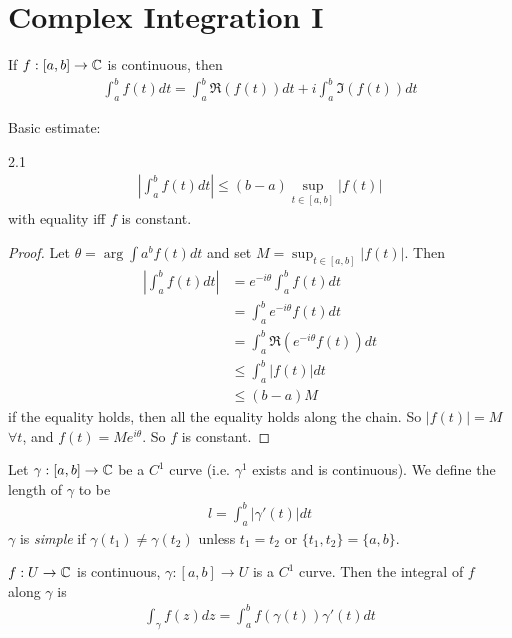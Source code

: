 \documentclass[a4paper]{article}
\begin{document}
\newpage

\section{Complex Integration I}
If $f:[a,b] \to \mathbb{C}$ is continuous, then
\begin{equation*}
\begin{aligned}
\int_a^b f(t) dt = \int_a^b \Re(f(t))dt + i \int_a^b \Im(f(t))dt
\end{aligned}
\end{equation*}

Basic estimate:
\begin{prop} 2.1\\
\begin{equation*}
\begin{aligned}
\left|\int_a^b f(t)dt\right| \leq (b-a) \sup_{t\in[a,b]} |f(t)|
\end{aligned}
\end{equation*}
with equality iff $f$ is constant.
\begin{proof}
Let $\theta = \arg\int a^b f(t) dt$ and set $M = \sup_{t \in [a,b]} |f(t)|$. Then
\begin{equation*}
\begin{aligned}
\left|\int_a^b f(t) dt\right| &= e^{-i\theta} \int_a^b f(t)dt\\
&= \int_a^b e^{-i\theta} f(t)dt\\
&= \int_a^b \Re(e^{-i\theta} f(t)) dt\\
&\leq \int_a^b |f(t)|dt\\
&\leq (b-a)M
\end{aligned}
\end{equation*}
if the equality holds, then all the equality holds along the chain. So $|f(t)|=M$ $\forall t$, and $f(t) = Me^{i\theta}$. So $f$ is constant.
\end{proof}
\end{prop}

Let $\gamma:[a,b] \to \mathbb{C}$ be a $C^1$ curve (i.e. $\gamma^1$ exists and is continuous). We define the length of $\gamma$ to be
\begin{equation*}
\begin{aligned}
l = \int_a^b |\gamma'(t)|dt
\end{aligned}
\end{equation*}
$\gamma$ is \emph{simple} if $\gamma(t_1) \neq \gamma(t_2)$ unless $t_1 = t_2$ or $\{t_1,t_2\} = \{a,b\}$.

\begin{defi}
$f:U \to \mathbb{C}$ is continuous, $\gamma:[a,b] \to U$ is a $C^1$ curve. Then the integral of $f$ along $\gamma$ is
\begin{equation*}
\begin{aligned}
\int_\gamma f(z) dz = \int_a^b f(\gamma(t)) \gamma'(t) dt
\end{aligned}
\end{equation*}
\end{defi}
\end{document}
